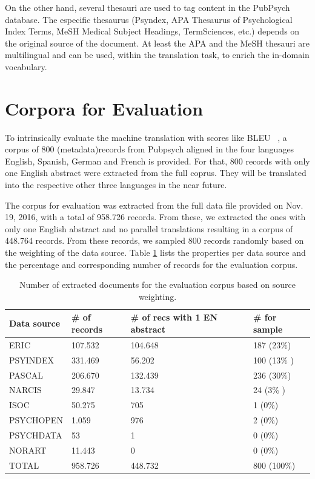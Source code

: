 \documentclass[a4paper,11pt]{article}
\begin{document}
On the other hand, several thesauri are used to tag content in the PubPsych database. The especific thesaurus (Psyndex, APA Thesaurus of Psychological Index Terms, MeSH Medical Subject Headings, TermSciences, etc.) depends on the original source of the document. At least the APA and the MeSH thesauri are multilingual and can be used, within the translation task, to enrich the in-domain vocabulary.

\section{Corpora for Evaluation}
\label{s:evaluation}
To intrinsically evaluate the machine translation with scores like BLEU ~\cite{papineni_bleu:_2002}, a corpus of 800 (metadata)records from Pubpsych aligned in the four languages English, Spanish, German and French is provided. For that, 800 records with only one English abstract were extracted from the full coprus. They will be translated into the respective other three languages in the near future. 

The corpus for evaluation was extracted from the full data file provided on Nov. 19, 2016, with a total of 958.726 records. From these, we extracted the ones with only one English abstract and no parallel translations resulting in a corpus of 448.764 records. From these records, we sampled 800 records randomly based on the weighting of the data source. Table \ref{tab:eval800} lists the properties per data source and the percentage and corresponding number of records for the evaluation corpus. 

\begin{small}
\begin{table}
\centering
\begin{tabular}{llll}
\toprule
Data source & \# of records & \# of recs with 1 EN abstract & \# for sample \\
\midrule
ERIC 		& 107.532 		& 104.648  & 187 (23\%) \\
PSYINDEX    & 331.469        & 56.202 & 100 (13\% )   \\
PASCAL      & 206.670        & 132.439 & 236 (30\%)           \\
NARCIS      & 29.847         & 13.734  & 24 (3\% )          \\
ISOC        & 50.275         & 705  & 1 (0\%)         \\
PSYCHOPEN   & 1.059          & 976    & 2  (0\%)           \\
PSYCHDATA   & 53            & 1  & 0  (0\%)           \\
NORART      & 11.443         & 0  & 0 (0\%)             \\
\midrule
TOTAL  &  958.726        & 448.732   & 800 (100\%)\\
\bottomrule
\end{tabular}
\caption{Number of extracted documents for the evaluation corpus based on source weighting.}
\label{tab:eval800}
\end{table}
\end{small}
\end{document}
